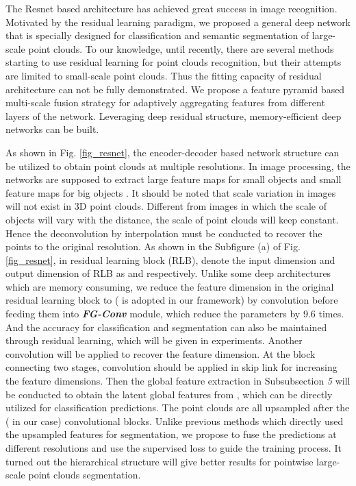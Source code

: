\documentclass[journal]{IEEEtran}
\begin{document}
The Resnet \cite{He_2016_CVPR} based architecture has achieved great success in image recognition. Motivated by the residual learning paradigm, we proposed a general deep network that is specially designed for classification and semantic segmentation of large-scale point clouds. To our knowledge, until recently, there are several methods   \cite{liu2019densepoint} \cite{li2019deepgcns} starting to use residual learning for point clouds recognition, but their attempts are limited to small-scale point clouds. Thus the fitting capacity of residual architecture can not be fully demonstrated. We propose a feature pyramid based multi-scale fusion strategy for adaptively aggregating features from different layers of the network. Leveraging deep residual structure, memory-efficient deep networks can be built. 


As shown in Fig. \ref{fig_resnet}, the encoder-decoder based network structure can be utilized to obtain point clouds at multiple resolutions. In image processing, the networks are supposed to extract large feature maps for small objects and small feature maps for big objects\cite{liu2020deep} \cite{wang2020deep}.  It should be noted that scale variation in images will not exist in 3D point clouds. Different from images in which the scale of objects will vary with the distance, the scale of point clouds will keep constant. Hence the deconvolution by interpolation must be conducted to recover the points to the original resolution. 
As shown in the Subfigure (a) of Fig. \ref{fig_resnet}, in residual learning block (RLB), denote the input dimension and output dimension of RLB as  and  respectively. Unlike some deep architectures which are memory consuming, we reduce the feature dimension in the original residual learning block to  ( is adopted in our framework) by  convolution before feeding them into \textbf{\textit{FG-Conv}} module, which reduce the parameters by 9.6 times. And the accuracy for classification and segmentation can also be maintained through residual learning, which will be given in experiments. Another  convolution will be applied to recover the feature dimension. At the block connecting two stages,  convolution should be applied in skip link for increasing the feature dimensions. Then the global feature extraction in Subsubsection \textit{5} will be conducted to obtain the latent global features  from , which can be directly utilized for classification predictions. The point clouds are all upsampled after the  ( in our case) convolutional blocks. Unlike previous methods which directly used the upsampled features for segmentation, we propose to fuse the predictions at different resolutions and use the supervised loss to guide the training process. It turned out the hierarchical structure will give better results for pointwise large-scale point clouds segmentation. 
\end{document}
